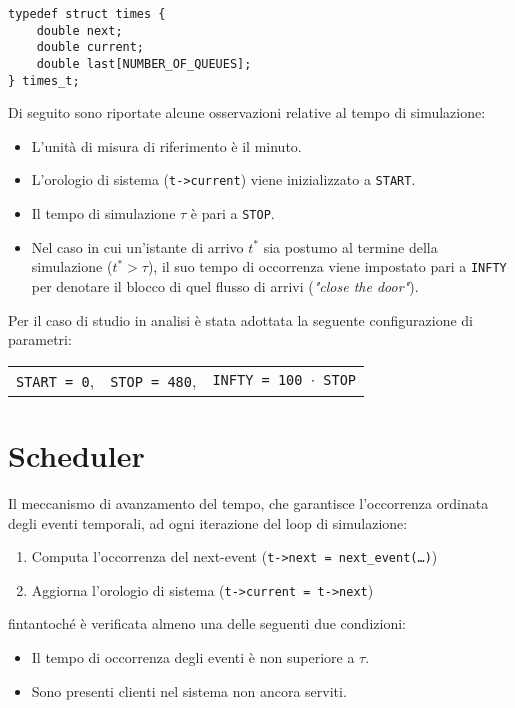 \begin{lstlisting}[label={lst:modello-computazionale-2}, caption={Struttura dati per la gestione del tempo}]
typedef struct times {
    double next;                 	                                         
    double current;                	
    double last[NUMBER_OF_QUEUES];  
} times_t;
\end{lstlisting}

Di seguito sono riportate alcune osservazioni relative al tempo di simulazione:
\begin{itemize}
\item L'unità di misura di riferimento è il minuto.
\item L'orologio di sistema (\texttt{t->current}) viene inizializzato a \texttt{START}.
\item Il tempo di simulazione $\tau$ è pari a \texttt{STOP}.
\item Nel caso in cui un'istante di arrivo $t^*$ sia postumo al termine della simulazione ($t^* > \tau$), il suo tempo di occorrenza viene impostato pari a \texttt{INFTY} per denotare il blocco di quel flusso di arrivi (\textit{"close the door"}).
\end{itemize}
Per il caso di studio in analisi è stata adottata la seguente configurazione di parametri:
\begin{center}
\begin{tabular}{l c r}
\texttt{START = 0}, & \texttt{STOP = 480\footnotemark}, & \texttt{INFTY = 100 $\cdot$ STOP}
\end{tabular}
\end{center}
\section{Scheduler}\label{sec:modello-computazionale-scheduler}
Il meccanismo di avanzamento del tempo, che garantisce l'occorrenza ordinata degli eventi temporali, ad ogni iterazione del loop di simulazione:
\begin{enumerate}
\item Computa l'occorrenza del next-event (\texttt{t->next = next\_event(\dots)})
\item Aggiorna l'orologio di sistema (\texttt{t->current = t->next})
\end{enumerate}
fintantoché è verificata almeno una delle seguenti due condizioni:
\begin{itemize}
\item Il tempo di occorrenza degli eventi è non superiore a $\tau$.
\item Sono presenti clienti nel sistema non ancora serviti.
\end{itemize}

